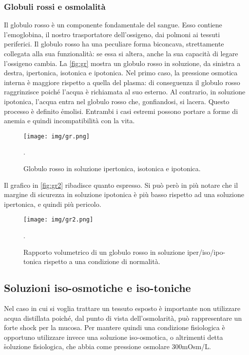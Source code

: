 \subsubsection{Globuli rossi e osmolalità}
Il globulo rosso è un componente fondamentale del sangue. Esso contiene l'emoglobina, il nostro trasportatore dell'ossigeno, dai polmoni ai tessuti periferici. Il globulo rosso ha una peculiare forma biconcava, strettamente collegata alla sua funzionalità: se essa si altera, anche la sua capacità di legare l'ossigeno cambia. La \autoref{fig:gr} mostra un globulo rosso in soluzione, da sinistra a destra, ipertonica, isotonica e ipotonica. Nel primo caso, la pressione osmotica interna è maggiore rispetto a quella del plasma: di conseguenza il globulo rosso raggrinzisce poiché l'acqua è richiamata al suo esterno. Al contrario, in soluzione ipotonica, l'acqua entra nel globulo rosso che, gonfiandosi, si lacera. Questo processo è definito \h{emolisi}. Entrambi i casi estremi possono portare a forme di anemia e quindi incompatibilità con la vita.

\begin{figure}[h]
    \centering
    \texttt{[image: img/gr.png]}
    \caption{Globulo rosso in soluzione ipertonica, isotonica e ipotonica.}
    \label{fig:gr}.
\end{figure}

Il grafico in \autoref{fig:gr2} ribadisce quanto espresso. Si può però in più notare che il margine di sicurezza in soluzione ipotonica è più basso rispetto ad una soluzione ipertonica, e quindi più pericolo.


\begin{figure}[h]
    \centering
    \texttt{[image: img/gr2.png]}
    \caption{Rapporto volumetrico di un globulo rosso in soluzione iper/iso/ipo-tonica rispetto a una condizione di normalità.}
    \label{fig:gr2}.
\end{figure}

\subsection{Soluzioni iso-osmotiche e iso-toniche}
Nel caso in cui si voglia trattare un tessuto esposto è importante non utilizzare acqua distillata poiché, dal punto di vista dell'osmolarità, può rappresentare un forte shock per la mucosa. Per mantere quindi una condizione fisiologica è opportuno utilizzare invece una soluzione iso-osmotica, o altrimenti detta \h{soluzione fisiologica}, che abbia come pressione osmolare 300mOsm/L.

